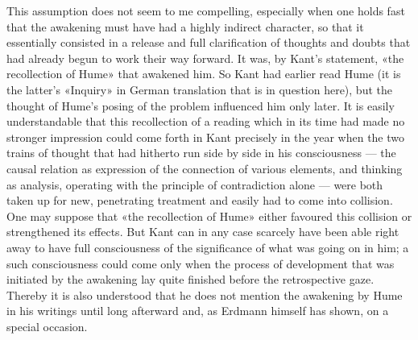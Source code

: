 \documentclass[12pt,a4paper]{article}
\begin{document}
This assumption does not seem to me compelling, especially when one holds
fast that the awakening must have had a highly indirect character, so that
it essentially consisted in a release and full clarification of thoughts
and doubts that had already begun to work their way forward. It was, by
Kant's statement, «the recollection of Hume» that awakened him. So Kant
had earlier read Hume (it is the latter's «Inquiry» in German translation
that is in question here), but the thought of Hume's posing of the problem
influenced him only later. It is easily understandable that this
recollection of a reading which in its time had made no stronger
impression could come forth in Kant precisely in the year when the two
trains of thought that had hitherto run side by side in his consciousness
--- the causal relation as expression of the connection of various
elements, and thinking as analysis, operating with the principle of
contradiction alone --- were both taken up for new, penetrating treatment
and easily had to come into collision. One may suppose that «the
recollection of Hume» either favoured this collision or strengthened its
effects. But Kant can in any case scarcely have been able right away to
have full consciousness of the significance of what was going on in him; a
such consciousness could come only when the process of development that
was initiated by the awakening lay quite finished before the retrospective
gaze. Thereby it is also understood that he does not mention the awakening
by Hume in his writings until long afterward and, as Erdmann himself has
shown, on a special occasion.
\end{document}

